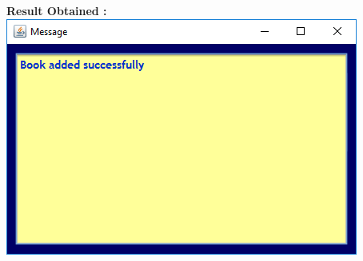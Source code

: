 \documentclass{article}
\begin{document}
\begin{enumerate}
\textbf{Result Obtained :}\\
\includegraphics[scale=0.8]{images/ClerkLogin/Actions/AddBook/BookAdded.PNG}\\


\end{enumerate}
\end{document}
